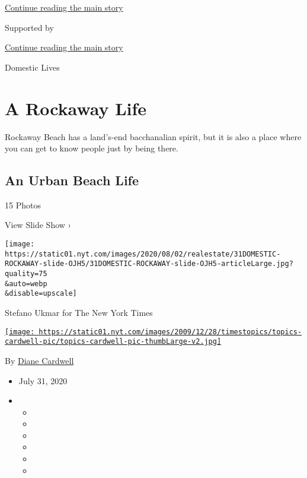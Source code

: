 \protect\hyperlink{after-top}{Continue reading the main story}

Supported by

\protect\hyperlink{after-sponsor}{Continue reading the main story}

Domestic Lives

\hypertarget{a-rockaway-life}{%
\section{A Rockaway Life}\label{a-rockaway-life}}

Rockaway Beach has a land's-end bacchanalian spirit, but it is also a
place where you can get to know people just by being there.

\href{https://www.nytimes.com/slideshow/2020/07/31/realestate/an-urban-beach-life.html}{}

\hypertarget{an-urban-beach-life}{%
\subsection{An Urban Beach Life}\label{an-urban-beach-life}}

15 Photos

View Slide Show ›

\texttt{[image: https://static01.nyt.com/images/2020/08/02/realestate/31DOMESTIC-ROCKAWAY-slide-OJH5/31DOMESTIC-ROCKAWAY-slide-OJH5-articleLarge.jpg?quality=75\\\&auto=webp\\\&disable=upscale]}

Stefano Ukmar for The New York Times

\href{https://www.nytimes.com/by/diane-cardwell}{\texttt{[image: https://static01.nyt.com/images/2009/12/28/timestopics/topics-cardwell-pic/topics-cardwell-pic-thumbLarge-v2.jpg]}}

By \href{https://www.nytimes.com/by/diane-cardwell}{Diane Cardwell}

\begin{itemize}
\item
  July 31, 2020
\item
  \begin{itemize}
  \item
  \item
  \item
  \item
  \item
  \item
  \end{itemize}
\end{itemize}

